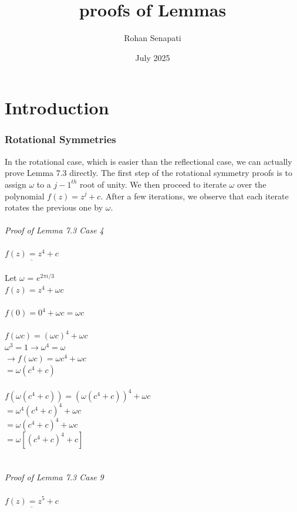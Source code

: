\documentclass{article}
\title{proofs of Lemmas}
\author{Rohan Senapati}
\date{July 2025}
\begin{document}
\maketitle

\section{Introduction}
\subsubsection{Rotational Symmetries}
In the rotational case, which is easier than the reflectional case, we can actually prove Lemma 7.3 directly. The first step of the rotational symmetry proofs is to assign $\omega$ to a $j-1^{th}$ root of unity. We then proceed to iterate $\omega$ over the polynomial $f(z) = z^j + c$. After a few iterations, we observe that each iterate rotates the previous one by $\omega$.
\\
\\
\textit{Proof of Lemma 7.3 Case 4}
\\
\\
$\underline{f(z) = z^4 + c}$           %
\\
\\
Let $\omega$ = $e^{2\pi i/3}$
\\$f(z) = z^4+\omega c$
\\
\\$f(0) = 0^4 + \omega c = \omega c$
\\
\\$f(\omega c) = (\omega c)^4 + \omega c$
\\$\omega^3 = 1 \rightarrow \omega^4 = \omega$
\\$\rightarrow f(\omega c) = \omega c^4 + \omega c$
\\$= \omega(c^4+c)$
\\
\\$f(\omega(c^4+c)) = (\omega(c^4+c))^4 + \omega c$
\\$= \omega^4(c^4+c)^4 + \omega c$
\\$= \omega(c^4+c)^4 + \omega c$
\\$= \omega[(c^4+c)^4+c]$
\\
\\
\\
\textit{Proof of Lemma 7.3 Case 9}
\\
\\
$\underline{f(z) = z^5 + c}$          %
\\
\end{document}
